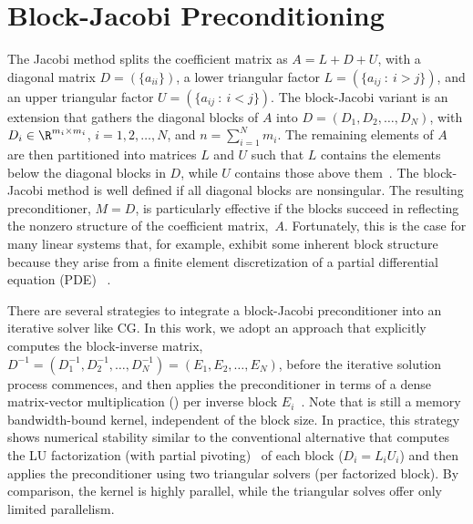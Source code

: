 \section{Block-Jacobi Preconditioning} \label{2017-adaptive-block-jacobi:sec:jacobi}

\newcommand{\hD}{E}

The Jacobi  method splits the coefficient matrix as $A=L+D+U$, with a diagonal
matrix $D=(\{a_{ii}\})$, a lower triangular factor $L=(\{a_{ij}~:~i>j\})$, and
an upper triangular factor $U=(\{a_{ij}~:~i<j\})$. The block-Jacobi variant is
an extension that gathers the diagonal blocks of $A$ into
$D=(D_1,D_2,\ldots,D_N)$, with $D_i\in \R^{m_i \times m_i}$, $i=1,2,\ldots,N$,
and $n=\sum_{i=1}^Nm_i$.
The remaining elements of $A$ are then partitioned into matrices $L$ and $U$
such that $L$ contains the elements below the diagonal blocks in $D$, while $U$
contains those  above them~\cite{gje}. The block-Jacobi method is well defined
if all diagonal blocks are nonsingular. The resulting preconditioner, $M=D$,
is particularly effective if the blocks succeed in reflecting the nonzero
structure of the coefficient matrix,~$A$. Fortunately, this is the case for many
linear systems that, for example, exhibit some inherent block structure because
they arise from a finite element discretization of a partial differential
equation (PDE)
~\cite{gje}.

There are several strategies to integrate a block-Jacobi preconditioner into
an iterative solver like CG. In this work, we adopt an approach that
explicitly computes the block-inverse matrix,
$D^{-1}=(D_1^{-1},D_2^{-1},\ldots,D_N^{-1}) =(\hD_1,\hD_2,\ldots,\hD_N)$, before
the iterative solution process commences, and then applies the preconditioner in
terms of a dense matrix-vector multiplication (\gemv) per inverse block 
$\hD_i$~\cite{ANZT2018}.
Note that \gemv is still a memory bandwidth-bound kernel, independent of the 
block
size. In practice, this strategy shows numerical stability similar to the
conventional alternative that computes the LU factorization (with partial
pivoting)~\cite{GVL3} of each block ($D_i=L_iU_i$) and then applies the
preconditioner using two triangular solvers (per factorized block). By 
comparison,
the \gemv kernel is highly parallel, while the triangular solves offer only 
limited 
parallelism.


